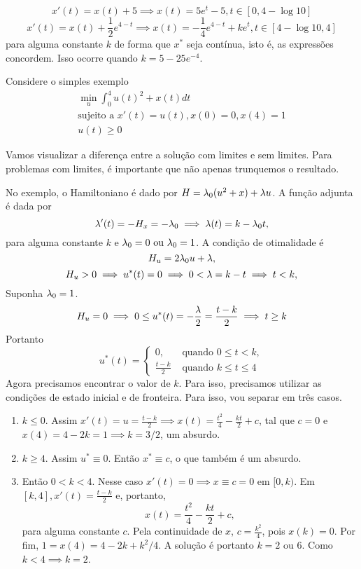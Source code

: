 $$
x'(t) = x(t) + 5 \implies x(t) = 5e^t - 5, t \in [0, 4-\log 10]
$$
$$
x'(t) = x(t) + \frac{1}{2}e^{4-t} \implies x(t) = -\frac{1}{4}e^{4-t} + ke^t, t \in [4 - \log 10, 4]
$$
para alguma constante $k$ de forma que $x^*$ seja contínua, isto é, as
expressões concordem. Isso ocorre quando $k = 5 - 25e^{-4}$. 

\begin{example}
    Considere o simples exemplo 
    \begin{gather*}
        \min_u \int_0^4 u(t)^2 + x(t) dt \\ 
        \text{sujeito a  }x'(t) = u(t), x(0) = 0, x(4) = 1 \\
        u(t) \ge 0 
    \end{gather*}
\end{example}

Vamos visualizar a diferença entre a solução com limites e sem limites. Para
problemas com limites, é importante que não apenas trunquemos o resultado. 

No exemplo, o Hamiltoniano é dado por $H = \lambda_0(u^2 + x) + \lambda u$. A função adjunta
é dada por 
$$\lambda '(t) = - H_x = -\lambda_0 \implies \lambda(t) = k - \lambda_0 t, 
$$
para alguma constante $k$ e $\lambda_0 = 0 \text{ ou } \lambda_0 = 1$. 
A condição de otimalidade é 
$$
H_u = 2\lambda_0 u + \lambda, 
$$
$$
H_u > 0 \implies u^*(t) = 0 \implies 0 < \lambda = k - t \implies t < k,
$$
Suponha $\lambda_0 = 1$.
$$
H_u = 0 \implies 0 \le u^*(t) = -\frac{\lambda}{2} = \frac{t-k}{2} \implies t \ge k
$$
Portanto 
$$
u^*(t) = \begin{cases}
    0, &\text{ quando } 0 \le t < k, \\ 
    \frac{t-k}{2} &\text{ quando } k \le t \le 4
\end{cases}
$$
Agora precisamos encontrar o valor de $k$. Para isso, precisamos utilizar as condições de estado inicial e de fronteira. Para isso, vou separar em três casos. 

\begin{enumerate}[label=\textbf{Caso \arabic*:}]
    \item $k \le 0$. Assim $x'(t) = u = \frac{t - k}{2} \implies x(t) = \frac{t^2}{4} - \frac{kt}{2} + c$, tal que $c=0$ e $x(4) = 4 - 2k = 1 \implies k = 3/2$, um absurdo. 
    
    \item $k \ge 4$. Assim $u^* \equiv 0$. Então $x^* \equiv c$, o que também é um absurdo. 
    
    \item Então $0 < k < 4$. Nesse caso $x'(t) = 0 \implies x \equiv c = 0$ em $[0,k)$. Em $[k,4], x'(t) = \frac{t-k}{2}$ e, portanto, 
    $$
    x(t) = \frac{t^2}{4} - \frac{kt}{2} + c,
    $$
    para alguma constante $c$. Pela continuidade de $x$, $c = \frac{k^2}{4}$, pois $x(k) = 0$. Por fim, $1 = x(4) = 4 - 2k + k^2/4$. A solução é portanto $k = 2 \text{ ou } 6$. Como $k < 4 \implies k = 2$.
\end{enumerate}

